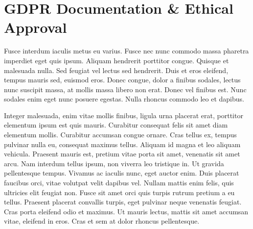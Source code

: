 \section{GDPR Documentation \& Ethical Approval}
\label{app:A}

\MAEindent

Fusce interdum iaculis metus eu varius. Fusce nec nunc commodo massa pharetra imperdiet eget quis ipsum. Aliquam hendrerit porttitor congue. Quisque et malesuada nulla. Sed feugiat vel lectus sed hendrerit. Duis et eros eleifend, tempus mauris sed, euismod eros. Donec congue, dolor a finibus sodales, lectus nunc suscipit massa, at mollis massa libero non erat. Donec vel finibus est. Nunc sodales enim eget nunc posuere egestas. Nulla rhoncus commodo leo et dapibus.

Integer malesuada, enim vitae mollis finibus, ligula urna placerat erat, porttitor elementum ipsum est quis mauris. Curabitur consequat felis sit amet diam elementum mollis. Curabitur accumsan congue ornare. Cras tellus ex, tempus pulvinar nulla eu, consequat maximus tellus. Aliquam id magna et leo aliquam vehicula. Praesent mauris est, pretium vitae porta sit amet, venenatis sit amet arcu. Nam interdum tellus ipsum, non viverra leo tristique in. Ut gravida pellentesque tempus. Vivamus ac iaculis nunc, eget auctor enim. Duis placerat faucibus orci, vitae volutpat velit dapibus vel. Nullam mattis enim felis, quis ultricies elit feugiat non. Fusce sit amet orci quis turpis rutrum pretium a eu tellus. Praesent placerat convallis turpis, eget pulvinar neque venenatis feugiat. Cras porta eleifend odio et maximus. Ut mauris lectus, mattis sit amet accumsan vitae, eleifend in eros. Cras et sem at dolor rhoncus pellentesque. 




